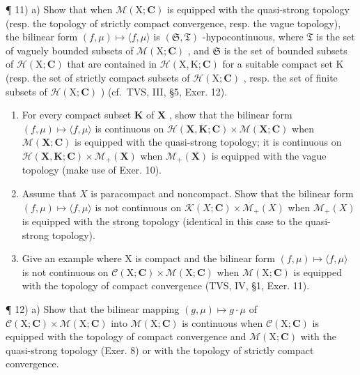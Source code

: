 ¶ 11) a) Show that when \(\mathcal{M}(\mathrm{X};\mathbf{C})\) is equipped with the quasi-strong topology (resp. the topology of strictly compact convergence, resp. the vague topology), the bilinear form \((f,\mu)\mapsto\langle f,\mu\rangle\) is \((\mathfrak{S},\mathfrak{T})\) -hypocontinuous, where \(\mathfrak{T}\) is the set of vaguely bounded subsets of \(\mathcal{M}(\mathrm{X};\mathbf{C})\) , and \(\mathfrak{S}\) is the set of bounded subsets of \(\mathcal{H}(\mathrm{X};\mathbf{C})\) that are contained in \(\mathcal{H}(\mathrm{X},\mathrm{K};\mathbf{C})\) for a suitable compact set K (resp. the set of strictly compact subsets of \(\mathcal{H}(\mathrm{X};\mathbf{C})\) , resp. the set of finite subsets of \(\mathcal{H}(\mathrm{X};\mathbf{C})\) ) (cf.~TVS, III, §5, Exer. 12).

\begin{enumerate}
\def\labelenumi{\alph{enumi})}
\setcounter{enumi}{1}
\item
  For every compact subset \(\mathbf{K}\) of \(\mathbf{X}\) , show that the bilinear form \((f, \mu) \mapsto \langle f, \mu \rangle\) is continuous on \(\mathcal{H}(\mathbf{X}, \mathbf{K}; \mathbf{C}) \times \mathcal{M}(\mathbf{X}; \mathbf{C})\) when \(\mathcal{M}(\mathbf{X}; \mathbf{C})\) is equipped with the quasi-strong topology; it is continuous on \(\mathcal{H}(\mathbf{X}, \mathbf{K}; \mathbf{C}) \times \mathcal{M}_{+}(\mathbf{X})\) when \(\mathcal{M}_{+}(\mathbf{X})\) is equipped with the vague topology (make use of Exer. 10).
\item
  Assume that \(X\) is paracompact and noncompact. Show that the bilinear form \((f, \mu) \mapsto \langle f, \mu \rangle\) is not continuous on \(\mathcal{K}(X; \mathbf{C}) \times \mathcal{M}_{+}(X)\) when \(\mathcal{M}_{+}(X)\) is equipped with the strong topology (identical in this case to the quasi-strong topology).
\item
  Give an example where X is compact and the bilinear form \((f,\mu)\mapsto\langle f,\mu\rangle\) is not continuous on \(\mathcal{C}(\mathrm{X};\mathbf{C})\times\mathcal{M}(\mathrm{X};\mathbf{C})\) when \(\mathcal{M}(\mathrm{X};\mathbf{C})\) is equipped with the topology of compact convergence (TVS, IV, §1, Exer. 11).
\end{enumerate}

¶ 12) a) Show that the bilinear mapping \((g, \mu) \mapsto g \cdot \mu\) of \(\mathcal{C}(\mathrm{X}; \mathbf{C}) \times \mathcal{M}(\mathrm{X}; \mathbf{C})\) into \(\mathcal{M}(\mathrm{X}; \mathbf{C})\) is continuous when \(\mathcal{C}(\mathrm{X}; \mathbf{C})\) is equipped with the topology of compact convergence and \(\mathcal{M}(\mathrm{X};\mathbf{C})\) with the quasi-strong topology (Exer. 8) or with the topology of strictly compact convergence.

